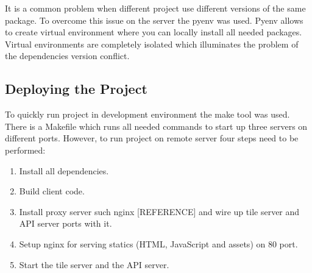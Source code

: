 It is a common problem when different project use different versions of the same
package. To overcome this issue on the server the pyenv was used. Pyenv allows
to create virtual environment where you can locally install all needed packages. Virtual
environments are completely isolated which illuminates the problem of the dependencies version
conflict.

\subsection{Deploying the Project}

To quickly run project in development environment the make tool was used. There is a Makefile
which runs all needed commands to start up three servers on different ports. However,
to run project on remote server four steps need to be performed:

\begin{enumerate}
  \item Install all dependencies.
  \item Build client code.
  \item Install proxy server such nginx [REFERENCE] and wire up tile server and API server ports with it.
  \item Setup nginx for serving statics (HTML, JavaScript and assets) on 80 port.
  \item Start the tile server and the API server.
\end{enumerate}